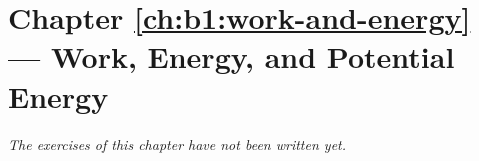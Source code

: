 \section*{Chapter \ref{ch:b1:work-and-energy} --- Work, Energy, and Potential Energy}


\emph{The exercises of this chapter have not been written yet.}
